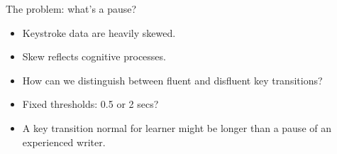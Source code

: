 \begin{frame}{The problem: what's a pause?}
	
	\begin{minipage}{.52\textwidth}
		\begin{small}
			\begin{itemize}
				\item Keystroke data are heavily skewed.
				\item Skew reflects cognitive processes.
				\item How can we distinguish between fluent and disfluent key transitions?
				\item Fixed thresholds: 0.5 or 2 secs?				
				\item A key transition normal for learner might be longer than a pause of an experienced writer.
			\end{itemize}
		\end{small}
	\end{minipage}
	\hfill
	\begin{minipage}{.45\textwidth}	
	\end{minipage}

	
\end{frame}